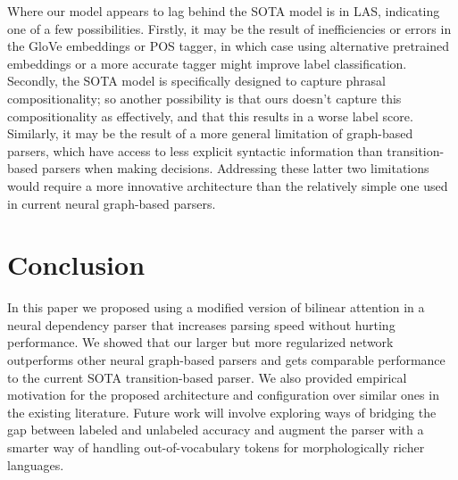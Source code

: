\documentclass[11pt,a4paper]{article}
\begin{document}
Where our model appears to lag behind the SOTA model is in LAS, indicating one of a few possibilities. Firstly, it may be the result of inefficiencies or errors in the GloVe embeddings or POS tagger, in which case using alternative pretrained embeddings or a more accurate tagger might improve label classification. Secondly, the SOTA model is specifically designed to capture phrasal compositionality; so another possibility is that ours doesn't capture this compositionality as effectively, and that this results in a worse label score. Similarly, it may be the result of a more general limitation of graph-based parsers, which have access to less explicit syntactic information than transition-based parsers when making decisions. Addressing these latter two limitations would require a more innovative architecture than the relatively simple one used in current neural graph-based parsers.

\section{Conclusion}
In this paper we proposed using a modified version of bilinear attention in a neural dependency parser that increases parsing speed without hurting performance. We showed that our larger but more regularized network outperforms other neural graph-based parsers and gets comparable performance to the current SOTA transition-based parser. We also provided empirical motivation for the proposed architecture and configuration over similar ones in the existing literature. Future work will involve exploring ways of bridging the gap between labeled and unlabeled accuracy and augment the parser with a smarter way of handling out-of-vocabulary tokens for morphologically richer languages.


\end{document}
